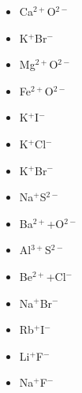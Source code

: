 \begin{minipage}{0.5\textwidth}
\end{minipage}%
\begin{minipage}{0.5\textwidth}
    \begin{itemize}
        \item[\rule{1cm}{0.2mm}] Ca$^{2+}$O$^{2-}$
        \item[\rule{1cm}{0.2mm}] K$^+$Br$^-$
        \item[\rule{1cm}{0.2mm}] Mg$^{2+}$O$^{2-}$
        \item[\rule{1cm}{0.2mm}] Fe$^{2+}$O$^{2-}$
        \item[\rule{1cm}{0.2mm}] K$^+$I$^-$
        \item[\rule{1cm}{0.2mm}] K$^+$Cl$^-$
        \item[\rule{1cm}{0.2mm}] K$^+$Br$^-$
        \item[\rule{1cm}{0.2mm}] Na$^+$S$^{2-}$
        \item[\rule{1cm}{0.2mm}] Ba$^{2+}$+O$^{2-}$
        \item[\rule{1cm}{0.2mm}] Al$^{3+}$S$^{2-}$
        \item[\rule{1cm}{0.2mm}] Be$^{2+}$+Cl$^{-}$
        \item[\rule{1cm}{0.2mm}] Na$^+$Br$^-$
        \item[\rule{1cm}{0.2mm}] Rb$^+$I$^-$
        \item[\rule{1cm}{0.2mm}] Li$^+$F$^-$
        \item[\rule{1cm}{0.2mm}] Na$^+$F$^-$
    \end{itemize}
\end{minipage}